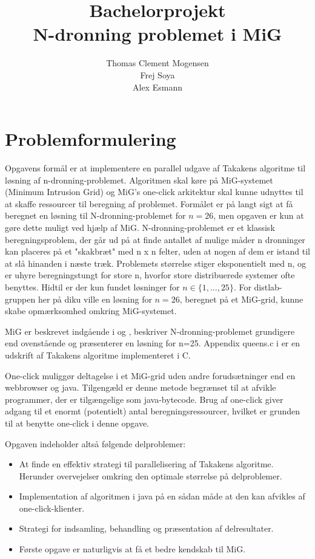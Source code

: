 \documentclass[a4,10pt]{article}
\title{Bachelorprojekt\\N-dronning problemet i MiG}
\author{Thomas Clement Mogensen \\ Frej Soya \\ Alex Esmann }
\begin{document}
\maketitle

\section{Problemformulering}\label{Problemformulering}


%
Opgavens formål er at implementere en parallel udgave af Takakens algoritme til løsning af n-dronning-problemet. Algoritmen skal køre på MiG-systemet (Minimum Intrusion Grid) og MiG's one-click arkitektur skal kunne udnyttes til at skaffe ressourcer til beregning af problemet. Formålet er på langt sigt at få beregnet en løsning til N-dronning-problemet for $n=26$, men opgaven er kun at gøre dette muligt ved hjælp af MiG. N-dronning-problemet er et klassisk beregningsproblem, der går ud på at finde antallet af mulige måder n dronninger kan placeres på et "skakbræt" med n x n felter, uden at nogen af dem er istand til at slå hinanden i næste træk. Problemets størrelse stiger eksponentielt med n, og er uhyre beregningstungt for store n, hvorfor store distribuerede systemer ofte benyttes. Hidtil er der kun fundet løsninger for $n \in \{1,...,25\}$. For distlab-gruppen her på diku ville en løsning for $n=26$, beregnet på et MiG-grid, kunne skabe opmærksomhed omkring MiG-systemet. 

MiG er beskrevet indgående i \cite{simplemig} og \cite{mig}, \cite{etsi} beskriver N-dronning-problemet grundigere end ovenstående og præsenterer en løsning for n=25. Appendix queens.c i \cite{etsi} er en udskrift af Takakens algoritme implementeret i C.

One-click muliggør deltagelse i et MiG-grid uden andre forudsætninger end en webbrowser og java. Tilgengæld er denne metode begrænset til at afvikle programmer, der er tilgængelige som java-bytecode. Brug af one-click giver adgang til et enormt (potentielt) antal beregningsressourcer, hvilket er grunden til at benytte one-click i denne opgave.    

Opgaven indeholder altså følgende delproblemer: 
\begin{itemize}
\item At finde en effektiv strategi til parallelisering af Takakens algoritme. Herunder overvejelser omkring den optimale størrelse på delproblemer.
\item Implementation af algoritmen i java på en sådan måde at den kan afvikles af one-click-klienter. 
\item Strategi for indsamling, behandling og præsentation af delresultater. 
\item Første opgave er naturligvis at få et bedre kendskab til MiG.
\end{itemize}
\end{document}
